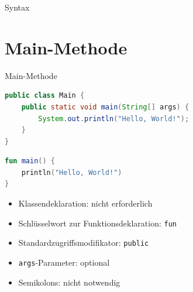\documentclass{beamer}
\begin{document}
\begin{frame}{Syntax}
  \tableofcontents[sections={1-4}]  
\end{frame}

\section{Main-Methode}
\begin{frame}[fragile]{Main-Methode}
  \begin{lstlisting}[language=Java, title=Java Main-Methode, xleftmargin=1em]
public class Main {
    public static void main(String[] args) {
        System.out.println("Hello, World!");
    }
}
  \end{lstlisting}
  \pause\begin{lstlisting}[language=Kotlin, title=Kotlin Main-Methode, xleftmargin=1em]
fun main() {
    println("Hello, World!")
}
  \end{lstlisting}
  \pause[]\begin{itemize}[<+->]
      \item Klassendeklaration: nicht erforderlich %
      \item Schlüsselwort zur Funktionsdeklaration: \texttt{fun}
      \item Standardzugriffsmodifikator: \texttt{public}
      \item \texttt{args}-Parameter: optional
      \item Semikolons: nicht notwendig
    \end{itemize}
    \vspace{1cm}
\end{frame}
\end{document}
